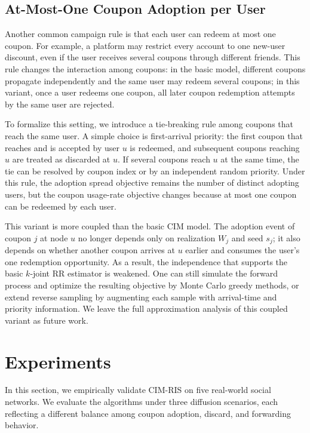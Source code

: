 \documentclass[sigconf]{acmart}
\newcommand{\CIMRIS}{\textsc{CIM-RIS}}
\begin{document}
\subsection{At-Most-One Coupon Adoption per User}
\label{sec:variant-one-coupon}

Another common campaign rule is that each user can redeem at most one
coupon.
For example, a platform may restrict every account to one new-user
discount, even if the user receives several coupons through different
friends.
This rule changes the interaction among coupons: in the basic model,
different coupons propagate independently and the same user may redeem
several coupons; in this variant, once a user redeems one coupon, all
later coupon redemption attempts by the same user are rejected.

To formalize this setting, we introduce a tie-breaking rule among
coupons that reach the same user.
A simple choice is first-arrival priority: the first coupon that reaches
and is accepted by user $u$ is redeemed, and subsequent coupons reaching
$u$ are treated as discarded at $u$.
If several coupons reach $u$ at the same time, the tie can be resolved by
coupon index or by an independent random priority.
Under this rule, the adoption spread objective remains the number of
distinct adopting users, but the coupon usage-rate objective changes
because at most one coupon can be redeemed by each user.

This variant is more coupled than the basic CIM model.
The adoption event of coupon $j$ at node $u$ no longer depends only on
realization $W_j$ and seed $s_j$; it also depends on whether another coupon
arrives at $u$ earlier and consumes the user's one redemption
opportunity.
As a result, the independence that supports the basic $k$-joint RR
estimator is weakened.
One can still simulate the forward process and optimize the resulting
objective by Monte Carlo greedy methods, or extend reverse sampling by
augmenting each sample with arrival-time and priority information.
We leave the full approximation analysis of this coupled variant as
future work.

\section{Experiments}
\label{sec:exp}

In this section, we empirically validate \CIMRIS{} on five real-world
social networks.
We evaluate the algorithms under three diffusion scenarios, each
reflecting a different balance among coupon adoption, discard, and
forwarding behavior.
\end{document}
